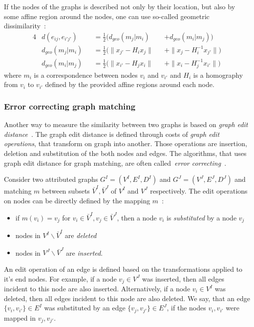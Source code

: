 \begin{itemize}
	If the nodes of the graphs is described not only by their location, but also by some affine region around the nodes, one can use so-called geometric dissimilarity~\cite{Cho2009_AgglClustering,Cho2012_ProgressiveGM}:
	\begin{alignat}{4}
	& d(e_{ij},e_{i'j'}) && =\frac{1}{2}(d_{geo}(m_j|m_i) && +d_{geo}(m_i|m_j)) \\
	& d_{geo}(m_j|m_i) && =\frac{1}{2}(\|x_{j'}-H_{i}x_j\| && + \|x_{j}-H^{-1}_ix_{j'}\|) \\
	& d_{geo}(m_i|m_j) && =\frac{1}{2}(\|x_{i'}-H_{j}x_i\| && + \|x_{i}-H^{-1}_{j}x_{i'}\|) 
	\end{alignat}
	where $m_i$ is a correspondence between nodes $v_i$ and $v_{i'}$ and $H_i$ is a homography from $v_i$ to $v_{i'}$ defined by the provided affine regions around each node.
\end{itemize}
\vspace{-5pt}

\subsubsection{Error correcting graph matching}
Another way to measure the similarity between two graphs is based on \emph{graph edit distance}~\cite{Bunke1983_inexactGM}. The graph edit distance is defined through costs of \emph{graph edit operations}, that transform on graph into another. Those operations are insertion, deletion and substitution of the both nodes and edges. The algorithms, that uses graph edit distance for graph matching, are often called~\emph{error correcting}~\cite{Conte2004}.

Consider two attributed graphs $G^I = (V^I, E^I,D^I)$ and $G^J = (V^J, E^J,D^J)$ and matching $m$ between subsets $\bar{V}^I,\bar{V}^J$ of $V^I$ and $V^J$ respectively. The edit operations on nodes can be directly defined by the mapping $m$~\cite{Bunke1998_ErrTolerantGM}:
\begin{itemize}
	\item if $m(v_i)=v_j$ for $v_i\in\bar{V}^I,v_j\in\bar{V}^J$, then a node $v_i$ is \emph{substituted} by a node $v_j$
	\item nodes in $V^I\backslash\bar{V}^I$ are \emph{deleted}
	\item nodes in $V^J\backslash\bar{V}^J$ are \emph{inserted}.
\end{itemize}
An edit operation of an edge is defined based on the transformations applied to it's end nodes. For example, if a node $v_j\in V^J$ was inserted, then all edges incident to this node are also inserted. Alternatively, if a node $v_i\in V^I$ was deleted, then all edges incident to this node are also deleted. We say, that an edge $\{v_i,v_{i'}\}\in E^I$ was substituted by an edge $\{v_j,v_{j'}\}\in E^J$, if the nodes $v_i,v_{i'}$ were mapped in $v_j,v_{j'}$.

